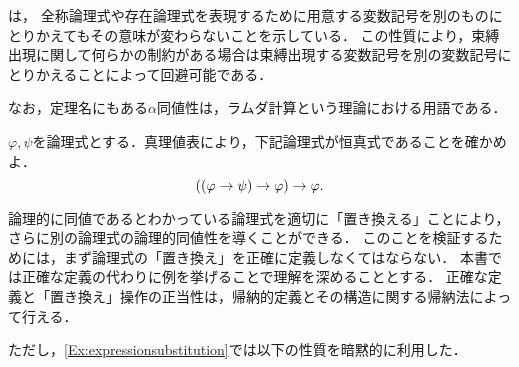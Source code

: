 \begin{Note}
	は，
	全称論理式や存在論理式を表現するために用意する変数記号を別のものにとりかえてもその意味が変わらないことを示している．
	この性質により，束縛出現に関して何らかの制約がある場合は束縛出現する変数記号を別の変数記号にとりかえることによって回避可能である．

	なお，定理名にもある\(\alpha\)同値性は，ラムダ計算という理論における用語である．
\end{Note}

\begin{Que} \label{Que:semanticpeircelaw}
	\(\varphi, \psi\)を論理式とする．真理値表により，下記論理式が恒真式であることを確かめよ．
	\begin{equation}
		\paren{\paren{\varphi \to \psi} \to \varphi} \to \varphi.
		\label{eq:semanticpeircelaw}
	\end{equation}
\end{Que}


論理的に同値であるとわかっている論理式を適切に「置き換える」ことにより，さらに別の論理式の論理的同値性を導くことができる．
このことを検証するためには，まず論理式の「置き換え」を正確に定義しなくてはならない．
本書では正確な定義の代わりに例を挙げることで理解を深めることとする．
正確な定義と「置き換え」操作の正当性は，帰納的定義とその構造に関する帰納法によって行える．


ただし，\cref{Ex:expressionsubstitution}では以下の性質を暗黙的に利用した．

